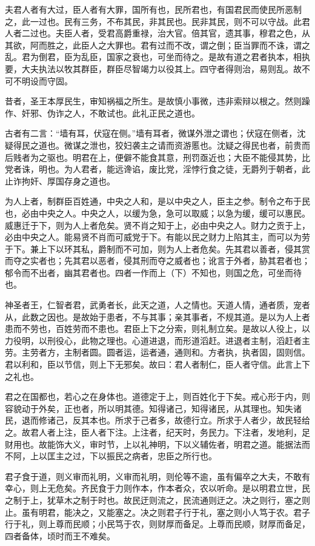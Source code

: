 \documentclass[]{article}
\begin{document}
夫君人者有大过，臣人者有大罪，国所有也，民所君也，有国君民而使民所恶制之，此一过也。民有三务，不布其民，非其民也。民非其民，则不可以守战。此君人者二过也。夫臣人者，受君高爵重禄，治大官。倍其官，遗其事，穆君之色，从其欲，阿而胜之，此臣人之大罪也。君有过而不改，谓之倒；臣当罪而不诛，谓之乱。君为倒君，臣为乱臣，国家之衰也，可坐而待之。是故有道之君者执本，相执要，大夫执法以牧其群臣，群臣尽智竭力以役其上。四守者得则治，易则乱。故不可不明设而守固。

昔者，圣王本厚民生，审知祸福之所生。是故慎小事微，违非索辩以根之。然则躁作、奸邪、伪诈之人，不敢试也。此礼正民之道也。

古者有二言：``墙有耳，伏寇在侧。''墙有耳者，微谋外泄之谓也；伏寇在侧者，沈疑得民之道也。微谋之泄也，狡妇袭主之请而资游慝也。沈疑之得民也者，前贵而后贱者为之驱也。明君在上，便僻不能食其意，刑罚亟近也；大臣不能侵其势，比党者诛，明也。为人君者，能远谗谄，废比党，淫悖行食之徒，无爵列于朝者，此止诈拘奸、厚国存身之道也。

为人上者，制群臣百姓通，中央之人和，是以中央之人，臣主之参。制令之布于民也，必由中央之人。中央之人，以缓为急，急可以取威；以急为缓，缓可以惠民。威惠迁于下，则为人上者危矣。贤不肖之知于上，必由中央之人。财力之贡于上，必由中央之人。能易贤不肖而可威党于下。有能以民之财力上陷其主，而可以为劳于下。兼上下以环其私，爵制而不可加，则为人上者危矣。先其君以善者，侵其赏而夺之实者也；先其君以恶者，侵其刑而夺之威者也；讹言于外者，胁其君者也；郁令而不出者，幽其君者也。四者一作而上（下）不知也，则国之危，可坐而待也。

神圣者王，仁智者君，武勇者长，此天之道，人之情也。天道人情，通者质，宠者从，此数之因也。是故始于患者，不与其事；亲其事者，不规其道。是以为人上者患而不劳也，百姓劳而不患也。君臣上下之分索，则礼制立矣。是故以人役上，以力役明，以刑役心，此物之理也。心道进退，而形道滔赶。进退者主制，滔赶者主劳。主劳者方，主制者圆。圆者运，运者通，通则和。方者执，执者固，固则信。君以利和，臣以节信，则上下无邪矣。故曰：君人者制仁，臣人者守信。此言上下之礼也。

君之在国都也，若心之在身体也。道德定于上，则百姓化于下矣。戒心形于内，则容貌动于外矣，正也者，所以明其德。知得诸己，知得诸民，从其理也。知失诸民，退而修诸己，反其本也。所求于己者多，故德行立。所求于人者少，故民轻给之。故君人者上注，臣人者下注。上注者，纪天时，务民力。下注者，发地利，足财用也。故能饰大义，审时节，上以礼神明，下以义辅佐者，明君之道。能据法而不阿，上以匡主之过，下以振民之病者，忠臣之所行也。

君子食于道，则义审而礼明，义审而礼明，则伦等不逾，虽有偏卒之大夫，不敢有幸心，则上无危矣。齐民食于力则作本，作本者众，农以听命。是以明君立世，民之制于上，犹草木之制于时也。故民迂则流之，民流通则迂之。决之则行，塞之则止。虽有明君，能决之，又能塞之。决之则君子行于礼，塞之则小人笃于农。君子行于礼，则上尊而民顺；小民笃于农，则财厚而备足。上尊而民顺，财厚而备足，四者备体，顷时而王不难矣。
\end{document}
